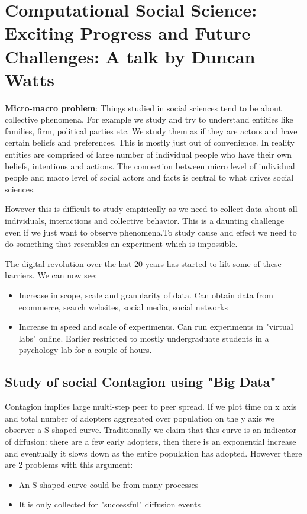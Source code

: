  \section{Computational Social Science: Exciting Progress and Future Challenges: A talk by Duncan Watts}
\textbf{Micro-macro problem}: Things studied in social sciences tend to be about collective phenomena. For example we study and try to understand entities like families, firm, political parties etc. We study them as if they are actors and have certain beliefs and preferences. This is mostly just out of convenience. In reality entities are comprised of large number of individual people who have their own beliefs, intentions and actions. The connection between micro level of individual people and macro level of social actors and facts is central to what drives social sciences.

 However this is difficult to study empirically as we need to collect data about all individuals, interactions and collective behavior. This is a daunting challenge even if we just want to observe phenomena.To study cause and effect we need to do something that resembles an experiment which is impossible.
 
 The digital revolution over the last 20 years has started to lift some of these barriers. We can now see:
 \begin{itemize}
 	\item Increase in scope, scale and granularity of data. Can obtain data from ecommerce, search websites, social media, social networks
 	\item Increase in speed and scale of experiments. Can run experiments in "virtual labs" online. Earlier restricted to mostly undergraduate students in a psychology lab for a couple of hours. 
\end{itemize}

\subsection{Study of social Contagion using "Big Data"}
Contagion implies large multi-step peer to peer spread. If we plot time on x axis and total number of adopters aggregated over population on the y axis we observer a S shaped curve. Traditionally we claim that this curve is an indicator of diffusion: there are a few early adopters, then there is an exponential increase and eventually it slows down as the entire population has adopted. However there are 2 problems with this argument:
 \begin{itemize}
 	\item An S shaped curve could be from many processes
 	\item It is only collected for "successful" diffusion events 
 \end{itemize}
 
